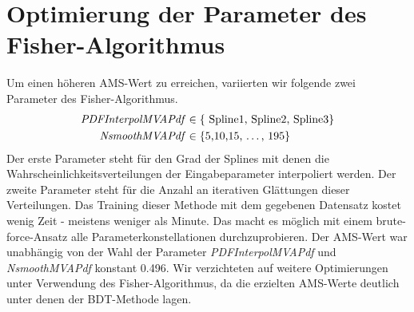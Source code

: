 \section{Optimierung der Parameter des Fisher-Algorithmus}
Um einen höheren AMS-Wert zu erreichen, variierten wir folgende zwei Parameter des Fisher-Algorithmus.
\begin{equation}
\begin{split}
 \mbox{\textit{PDFInterpolMVAPdf}} &\in \{ \mbox{ Spline1,  Spline2, Spline3}  \}  \\
 \mbox{\textit{NsmoothMVAPdf}} &\in \{ \mbox{5,10,15, \ldots, 195} \}
\end{split}
\end{equation}
Der erste Parameter steht für den Grad der Splines mit denen die Wahrscheinlichkeitsverteilungen der Eingabeparameter interpoliert werden. Der zweite Parameter steht für die Anzahl an iterativen Glättungen dieser Verteilungen. 
Das Training dieser Methode mit dem gegebenen Datensatz kostet wenig Zeit - meistens weniger als Minute. Das macht es möglich mit einem brute-force-Ansatz alle Parameterkonstellationen durchzuprobieren. Der AMS-Wert war unabhängig von der Wahl der Parameter \textit{PDFInterpolMVAPdf} und \textit{NsmoothMVAPdf} konstant 0.496. Wir verzichteten auf weitere Optimierungen unter Verwendung des Fisher-Algorithmus, da die erzielten AMS-Werte deutlich unter denen der BDT-Methode lagen.